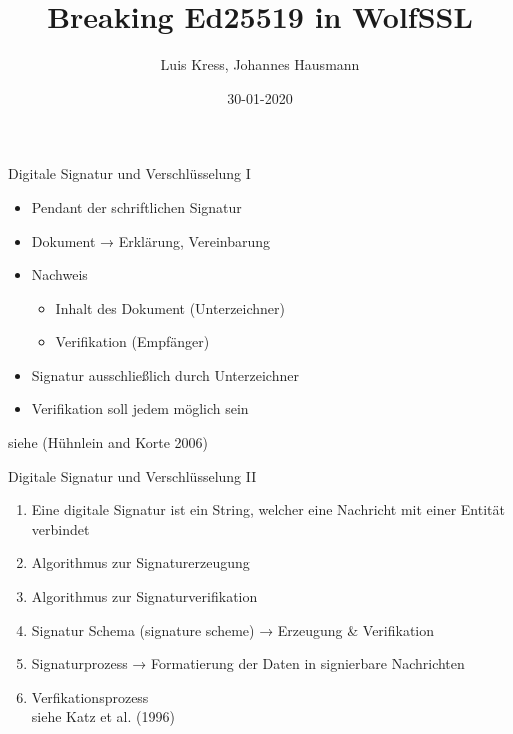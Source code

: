 \documentclass[
  10pt,
  ignorenonframetext,
  aspectratio=43,
]{beamer}
\title{Breaking Ed25519 in WolfSSL}
\author{Luis Kress, Johannes Hausmann}
\date{30-01-2020}
\institute{Technische Hochschule Bingen}
\providecommand{\tightlist}{%
  \setlength{\itemsep}{0pt}\setlength{\parskip}{0pt}}
\begin{document}
\frame{\titlepage}

\begin{frame}[allowframebreaks]
  \tableofcontents[hideallsubsections]
\end{frame}
\begin{frame}{Digitale Signatur und Verschlüsselung I}
\protect\hypertarget{digitale-signatur-und-verschluxfcsselung-i}{}
\begin{itemize}
\item
  Pendant der schriftlichen Signatur
\item
  Dokument → Erklärung, Vereinbarung
\item
  Nachweis

  \begin{itemize}
  \tightlist
  \item
    Inhalt des Dokument (Unterzeichner)
  \item
    Verifikation (Empfänger)
  \end{itemize}
\item
  Signatur ausschließlich durch Unterzeichner
\item
  Verifikation soll jedem möglich sein
\end{itemize}

siehe (Hühnlein and Korte 2006)
\end{frame}

\begin{frame}{Digitale Signatur und Verschlüsselung II}
\protect\hypertarget{digitale-signatur-und-verschluxfcsselung-ii}{}
\begin{enumerate}
\tightlist
\item
  Eine digitale Signatur ist ein String, welcher eine Nachricht mit
  einer Entität verbindet
\item
  Algorithmus zur Signaturerzeugung\\
\item
  Algorithmus zur Signaturverifikation
\item
  Signatur Schema (signature scheme) → Erzeugung \& Verifikation
\item
  Signaturprozess → Formatierung der Daten in signierbare Nachrichten
\item
  Verfikationsprozess\\
  siehe Katz et al. (1996)
\end{enumerate}
\end{frame}
\end{document}
